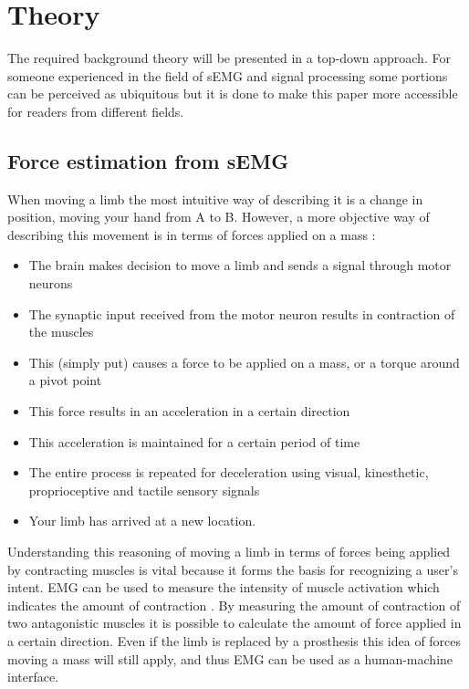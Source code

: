 \chapter{Theory}
The required background theory will be presented in a top-down approach. For someone experienced in the field of sEMG and signal processing some portions can be perceived as ubiquitous but it is done to make this paper more accessible for readers from different fields.

\section{Force estimation from sEMG}
When moving a limb the most intuitive way of describing it is a change in position, moving your hand from A to B. However, a more objective way of describing this movement is in terms of forces applied on a mass \cite{human_physiology,human_anatomy_physiology,3d_printing_soft_semg}:
\begin{itemize}
    \item The brain makes decision to move a limb and sends a signal through motor neurons
    \item The synaptic input received from the motor neuron results in contraction of the muscles
    \item This (simply put) causes a force to be applied on a mass, or a torque around a pivot point
    \item This force results in an acceleration in a certain direction
    \item This acceleration is maintained for a certain period of time
    \item The entire process is repeated for deceleration using visual, kinesthetic, proprioceptive and tactile sensory signals \cite{human_robotics}
    \item Your limb has arrived at a new location.
\end{itemize} 

Understanding this reasoning of moving a limb in terms of forces being applied by contracting muscles is vital because it forms the basis for recognizing a user's intent. EMG can be used to measure the intensity of muscle activation which indicates the amount of contraction \cite{human_robotics}. By measuring the amount of contraction of two antagonistic muscles it is possible to calculate the amount of force applied in a certain direction. Even if the limb is replaced by a prosthesis this idea of forces moving a mass will still apply, and thus EMG can be used as a human-machine interface.

